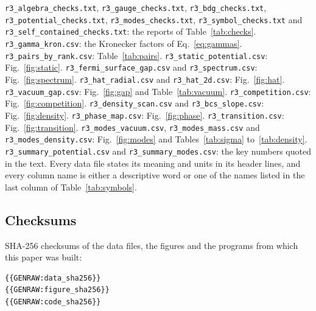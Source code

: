\texttt{r3\_algebra\_checks.txt}, \texttt{r3\_gauge\_checks.txt}, \texttt{r3\_bdg\_checks.txt},
\texttt{r3\_potential\_checks.txt}, \texttt{r3\_modes\_checks.txt}, \texttt{r3\_symbol\_checks.txt} and
\texttt{r3\_self\_contained\_checks.txt}: the reports of Table~\ref{tab:checks}.
\texttt{r3\_gamma\_kron.csv}: the Kronecker factors of Eq.~\eqref{eq:gammas}.
\texttt{r3\_pairs\_by\_rank.csv}: Table~\ref{tab:pairs}.
\texttt{r3\_static\_potential.csv}: Fig.~\ref{fig:static}.
\texttt{r3\_fermi\_surface\_gap.csv} and \texttt{r3\_spectrum.csv}: Fig.~\ref{fig:spectrum}.
\texttt{r3\_hat\_radial.csv} and \texttt{r3\_hat\_2d.csv}: Fig.~\ref{fig:hat}.
\texttt{r3\_vacuum\_gap.csv}: Fig.~\ref{fig:gap} and Table~\ref{tab:vacuum}.
\texttt{r3\_competition.csv}: Fig.~\ref{fig:competition}.
\texttt{r3\_density\_scan.csv} and \texttt{r3\_bcs\_slope.csv}: Fig.~\ref{fig:density}.
\texttt{r3\_phase\_map.csv}: Fig.~\ref{fig:phase}.
\texttt{r3\_transition.csv}: Fig.~\ref{fig:transition}.
\texttt{r3\_modes\_vacuum.csv}, \texttt{r3\_modes\_mass.csv} and \texttt{r3\_modes\_density.csv}:
Fig.~\ref{fig:modes} and Tables~\ref{tab:sigma} to~\ref{tab:density}.
\texttt{r3\_summary\_potential.csv} and \texttt{r3\_summary\_modes.csv}: the key numbers quoted in the
text. Every data file states its meaning and units in its header lines, and every column name is
either a descriptive word or one of the names listed in the last column of Table~\ref{tab:symbols}.

\subsection{Checksums}

SHA-256 checksums of the data files, the figures and the programs from which this paper was built:
{\footnotesize
\begin{verbatim}
{{GENRAW:data_sha256}}
{{GENRAW:figure_sha256}}
{{GENRAW:code_sha256}}
\end{verbatim}
}

\twocolumngrid

